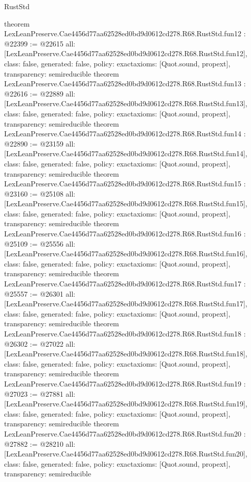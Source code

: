 \begin{lexlean}{RustStd}
\begin{coremodule}
{}
theorem LexLeanPreserve.Cae4456d77aa62528ed0bd9d0612cd278.R68.RustStd.fun12 : @22399 := @22615 {
  all: [LexLeanPreserve.Cae4456d77aa62528ed0bd9d0612cd278.R68.RustStd.fun12],
  class: false,
  generated: false,
  policy: exact{axioms: [Quot.sound, propext]},
  transparency: semireducible
}
theorem LexLeanPreserve.Cae4456d77aa62528ed0bd9d0612cd278.R68.RustStd.fun13 : @22616 := @22889 {
  all: [LexLeanPreserve.Cae4456d77aa62528ed0bd9d0612cd278.R68.RustStd.fun13],
  class: false,
  generated: false,
  policy: exact{axioms: [Quot.sound, propext]},
  transparency: semireducible
}
theorem LexLeanPreserve.Cae4456d77aa62528ed0bd9d0612cd278.R68.RustStd.fun14 : @22890 := @23159 {
  all: [LexLeanPreserve.Cae4456d77aa62528ed0bd9d0612cd278.R68.RustStd.fun14],
  class: false,
  generated: false,
  policy: exact{axioms: [Quot.sound, propext]},
  transparency: semireducible
}
theorem LexLeanPreserve.Cae4456d77aa62528ed0bd9d0612cd278.R68.RustStd.fun15 : @23160 := @25108 {
  all: [LexLeanPreserve.Cae4456d77aa62528ed0bd9d0612cd278.R68.RustStd.fun15],
  class: false,
  generated: false,
  policy: exact{axioms: [Quot.sound, propext]},
  transparency: semireducible
}
theorem LexLeanPreserve.Cae4456d77aa62528ed0bd9d0612cd278.R68.RustStd.fun16 : @25109 := @25556 {
  all: [LexLeanPreserve.Cae4456d77aa62528ed0bd9d0612cd278.R68.RustStd.fun16],
  class: false,
  generated: false,
  policy: exact{axioms: [Quot.sound, propext]},
  transparency: semireducible
}
theorem LexLeanPreserve.Cae4456d77aa62528ed0bd9d0612cd278.R68.RustStd.fun17 : @25557 := @26301 {
  all: [LexLeanPreserve.Cae4456d77aa62528ed0bd9d0612cd278.R68.RustStd.fun17],
  class: false,
  generated: false,
  policy: exact{axioms: [Quot.sound, propext]},
  transparency: semireducible
}
theorem LexLeanPreserve.Cae4456d77aa62528ed0bd9d0612cd278.R68.RustStd.fun18 : @26302 := @27022 {
  all: [LexLeanPreserve.Cae4456d77aa62528ed0bd9d0612cd278.R68.RustStd.fun18],
  class: false,
  generated: false,
  policy: exact{axioms: [Quot.sound, propext]},
  transparency: semireducible
}
theorem LexLeanPreserve.Cae4456d77aa62528ed0bd9d0612cd278.R68.RustStd.fun19 : @27023 := @27881 {
  all: [LexLeanPreserve.Cae4456d77aa62528ed0bd9d0612cd278.R68.RustStd.fun19],
  class: false,
  generated: false,
  policy: exact{axioms: [Quot.sound, propext]},
  transparency: semireducible
}
theorem LexLeanPreserve.Cae4456d77aa62528ed0bd9d0612cd278.R68.RustStd.fun20 : @27882 := @28210 {
  all: [LexLeanPreserve.Cae4456d77aa62528ed0bd9d0612cd278.R68.RustStd.fun20],
  class: false,
  generated: false,
  policy: exact{axioms: [Quot.sound, propext]},
  transparency: semireducible
}
\end{coremodule}
\end{lexlean}
